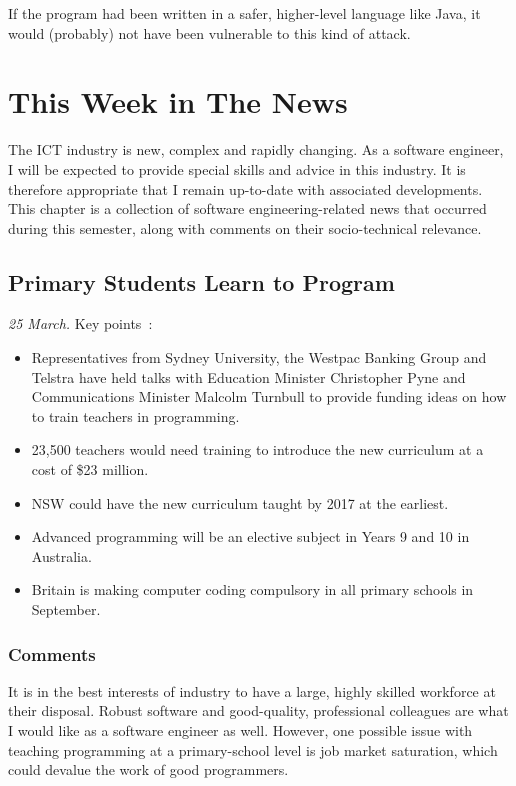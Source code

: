 \documentclass[11pt,a4paper]{report}
\begin{document}
	If the program had been written in a safer, higher-level language like Java, it would (probably) not have been vulnerable to this kind of attack.
	
	\chapter{This Week in The News}
	The ICT industry is new, complex and rapidly changing. As a software engineer, I will be expected to provide special skills and advice in this industry. It is therefore appropriate that I remain up-to-date with associated developments. This chapter is a collection of software engineering-related news that occurred during this semester, along with comments on their socio-technical relevance.
	
	\section{Primary Students Learn to Program}
	\textit{25 March.} Key points~\cite{news4}:
	\begin{itemize}
		\item Representatives from Sydney University, the Westpac Banking Group and Telstra have held talks with Education Minister Christopher Pyne and Communications Minister Malcolm Turnbull to provide funding ideas on how to train teachers in programming.
		\item 23,500 teachers would need training to introduce the new curriculum at a cost of \$23 million.
		\item NSW could have the new curriculum taught by 2017 at the earliest.
		\item Advanced programming will be an elective subject in Years 9 and 10 in Australia.
		\item Britain is making computer coding compulsory in all primary schools in September.
	\end{itemize}
	
	\subsection{Comments}
	It is in the best interests of industry to have a large, highly skilled workforce at their disposal. Robust software and good-quality, professional colleagues are what I would like as a software engineer as well. However, one possible issue with teaching programming at a primary-school level is job market saturation, which could devalue the work of good programmers.
	
\end{document}
